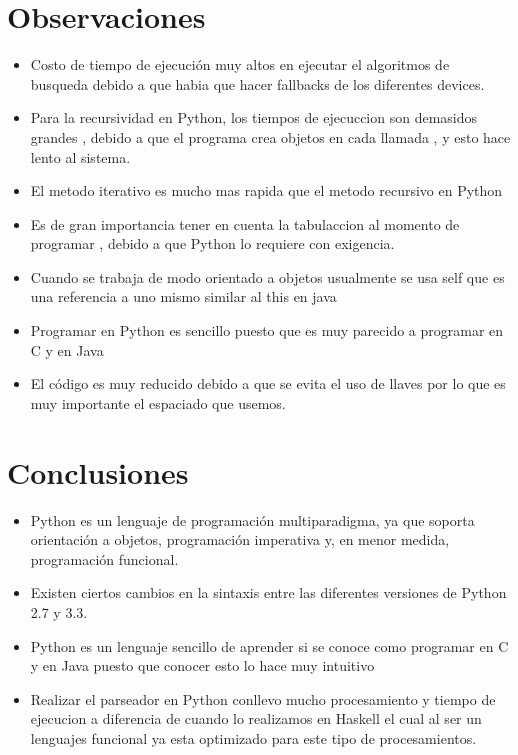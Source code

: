 \documentclass[11pt]{article} %
\begin{document}
\section{\fontsize{14}{0} \bf Observaciones}
\begin{itemize}
\item Costo de tiempo de ejecución muy altos en ejecutar el algoritmos de busqueda debido a que habia que hacer fallbacks de los diferentes devices.
\item Para la recursividad en Python, los tiempos de ejecuccion son demasidos grandes , debido a que el programa crea objetos en cada llamada , y esto hace lento al sistema.
\item El metodo  iterativo es mucho mas rapida que el metodo recursivo  en Python
\item Es de gran importancia tener en cuenta la tabulaccion al momento de programar , debido a que Python lo requiere con exigencia.
\item Cuando se trabaja de modo orientado a objetos usualmente se usa self que es una referencia a uno mismo similar al this en java
\item Programar en Python es sencillo puesto que es muy parecido a programar en C y en Java 
\item El código es muy reducido debido a que se evita el uso de llaves por lo que es muy importante el espaciado que usemos.

\end{itemize}


\section{\fontsize{14}{0} \bf Conclusiones}

\begin{itemize}
\item Python es un lenguaje de programación multiparadigma, ya que soporta orientación a objetos, programación imperativa y, en menor medida, programación funcional.
\item Existen ciertos cambios en la sintaxis entre las diferentes versiones de Python 2.7 y 3.3.
\item Python es un lenguaje sencillo de aprender si se conoce como programar en C y en Java puesto que conocer esto lo hace muy intuitivo
\item Realizar el parseador en Python conllevo mucho procesamiento y tiempo de ejecucion a diferencia de cuando lo realizamos en Haskell el cual al ser un lenguajes funcional ya esta optimizado para este tipo de procesamientos.

\end{itemize}
\end{document}
